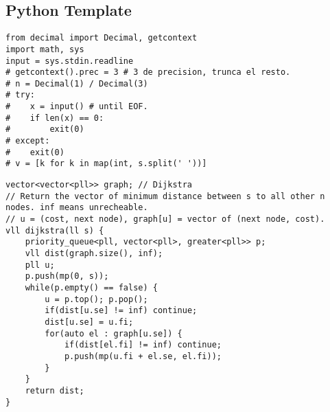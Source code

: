 \documentclass[a4paper]{article}
\begin{document}
\subsection*{Python Template}
\begin{multicols}{2}
\begin{verbatim}
from decimal import Decimal, getcontext
import math, sys
input = sys.stdin.readline
# getcontext().prec = 3 # 3 de precision, trunca el resto.
# n = Decimal(1) / Decimal(3)
# try:
#    x = input() # until EOF.
#    if len(x) == 0:
#        exit(0)
# except:
#    exit(0)
# v = [k for k in map(int, s.split(' '))]
\end{verbatim}
\end{multicols}
\begin{multicols}{2}
\begin{verbatim}
vector<vector<pll>> graph; // Dijkstra
// Return the vector of minimum distance between s to all other n nodes. inf means unrecheable.
// u = (cost, next node), graph[u] = vector of (next node, cost).
vll dijkstra(ll s) {
    priority_queue<pll, vector<pll>, greater<pll>> p;
    vll dist(graph.size(), inf);
    pll u;
    p.push(mp(0, s));
    while(p.empty() == false) {
        u = p.top(); p.pop();
        if(dist[u.se] != inf) continue;
        dist[u.se] = u.fi;
        for(auto el : graph[u.se]) {
            if(dist[el.fi] != inf) continue;
            p.push(mp(u.fi + el.se, el.fi));
        }
    }
    return dist;
}
\end{verbatim}
\end{multicols}

\begin{verbatim}
\end{verbatim}
\begin{verbatim}
\end{verbatim}
\end{document}
